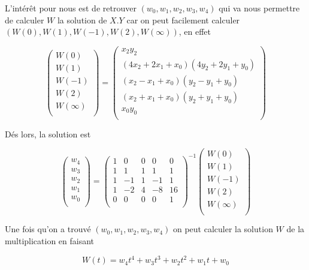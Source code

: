 \documentclass[letterpaper]{article}
\begin{document}
L'intérêt pour nous est de retrouver $(w_0, w_1, w_2, w_3, w_4)$ qui va nous
permettre de calculer $W$ la solution de $X.Y$ car on peut facilement calculer
$(W(0), W(1), W(-1), W(2), W(\infty))$, en effet

$${\displaystyle
\begin{pmatrix}
  W(0) \\
  W(1) \\
  W(-1) \\
  W(2) \\
  W(\infty) \\
\end{pmatrix}
=
\begin{pmatrix}
  x_2y_2 \\
  (4x_2 + 2x_1 + x_0) (4y_2+ 2y_1 + y_0)\\
  (x_2 - x_1 + x_0) (y_2 - y_1 + y_0)\\
  (x_2 + x_1 + x_0) (y_2 + y_1 + y_0)\\
  x_0y_0\\
\end{pmatrix}
}$$

Dés lors, la solution est

$$
\begin{pmatrix}
  w_4 \\
  w_3 \\
  w_2 \\
  w_1 \\
  w_0 \\
 \end{pmatrix}
=
\begin{pmatrix}
  1 & 0 & 0 & 0 & 0 \\
  1 & 1 & 1 & 1 & 1 \\
  1 &-1 & 1 &-1 & 1 \\
  1 &-2 & 4 &-8 &16 \\
  0 & 0 & 0 & 0 & 1 \\
\end{pmatrix}^{-1}
\begin{pmatrix}
  W(0) \\
  W(1) \\
  W(-1) \\
  W(2) \\
  W(\infty) \\
\end{pmatrix}
$$

Une fois qu'on a trouvé $(w_0, w_1, w_2, w_3, w_4)$ on peut calculer la
solution $W$ de la multiplication en faisant

  $$W(t) = w_4 t^4 + w_3 t^3 + w_2 t^2 + w_1 t + w_0$$
\end{document}
